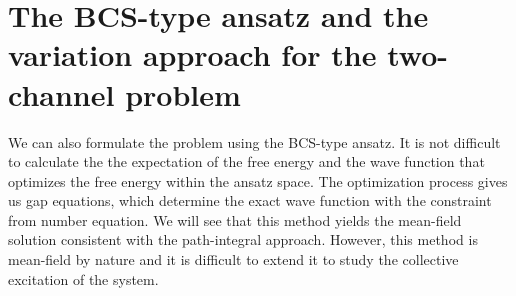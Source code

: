\chapter{The BCS-type ansatz and the variation approach for the two-channel problem \label{ch:mean}}
We can also formulate the problem  using the  BCS-type ansatz.  It is not difficult to calculate the the expectation of the free energy and  the wave function that optimizes the free energy within the ansatz space.  The optimization process gives us gap equations, which determine the exact wave function with the constraint from number equation.   %
We will see that this method yields  the mean-field solution consistent with the path-integral approach.  However, this method is mean-field by nature and it is difficult  to extend it to study the collective excitation of the system.  

